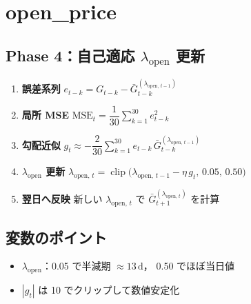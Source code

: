 
\section*{open\_price}\nopagebreak[4]

\subsection*{Phase 4：自己適応 $\lambda_{\text{open}}$ 更新}\nopagebreak[4]
\begin{flushleft}
\begin{enumerate}
  \item \textbf{誤差系列}\;
        \( e_{t-k}=G_{t-k}-\bar G_{t-k}^{(\lambda_{\text{open},\,t-1})} \)

  \item \textbf{局所 MSE}\;
        \( \mathrm{MSE}_t = \dfrac{1}{30}\sum_{k=1}^{30} e_{t-k}^2 \)

  \item \textbf{勾配近似}\;
        \( g_t \approx -\dfrac{2}{30}\sum_{k=1}^{30}
           e_{t-k}\,\bar G_{t-k}^{(\lambda_{\text{open},\,t-1})} \)

  \item \textbf{$\lambda_{\text{open}}$ 更新}\;
        \( \lambda_{\text{open},\,t}
           = \operatorname{clip}\bigl(
             \lambda_{\text{open},\,t-1}-\eta\,g_t,\,
             0.05,\,0.50 \bigr) \)

  \item \textbf{翌日へ反映}\;
        新しい \(\lambda_{\text{open},\,t}\) で
        \(\bar G_{t+1}^{(\lambda_{\text{open},\,t})}\) を計算
\end{enumerate}
\end{flushleft}

\subsection*{変数のポイント}
\begin{flushleft}
\begin{itemize}
  \item \(\lambda_{\text{open}}\)：0.05 で半減期 \(\approx 13\,\text{d}\)，  
        0.50 でほぼ当日値
  \item \(|g_t|\) は 10 でクリップして数値安定化
\end{itemize}
\end{flushleft}

